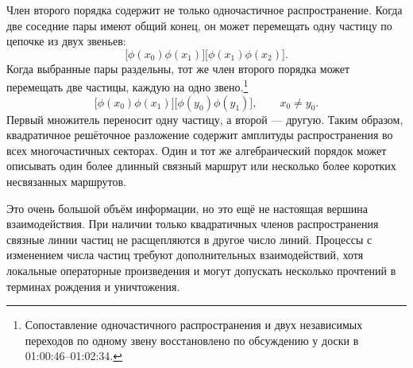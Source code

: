 Член второго порядка содержит не только одночастичное распространение. Когда две соседние пары имеют общий конец, он может перемещать одну частицу по цепочке из двух звеньев:
\begin{equation}
\bigl[\phi(x_0)\phi(x_1)\bigr]
\bigl[\phi(x_1)\phi(x_2)\bigr].
\end{equation}
Когда выбранные пары раздельны, тот же член второго порядка может перемещать две частицы, каждую на одно звено.\footnote{Сопоставление одночастичного распространения и двух независимых переходов по одному звену восстановлено по обсуждению у доски в 01:00:46--01:02:34.}
\begin{equation}
\bigl[\phi(x_0)\phi(x_1)\bigr]
\bigl[\phi(y_0)\phi(y_1)\bigr],
\qquad x_0\neq y_0.
\end{equation}
Первый множитель переносит одну частицу, а второй — другую. Таким образом, квадратичное решёточное разложение содержит амплитуды распространения во всех многочастичных секторах. Один и тот же алгебраический порядок может описывать один более длинный связный маршрут или несколько более коротких несвязанных маршрутов.

Это очень большой объём информации, но это ещё не настоящая вершина взаимодействия. При наличии только квадратичных членов распространения связные линии частиц не расщепляются в другое число линий. Процессы с изменением числа частиц требуют дополнительных взаимодействий, хотя локальные операторные произведения и могут допускать несколько прочтений в терминах рождения и уничтожения.

\begin{classroomqa}
\end{classroomqa}



